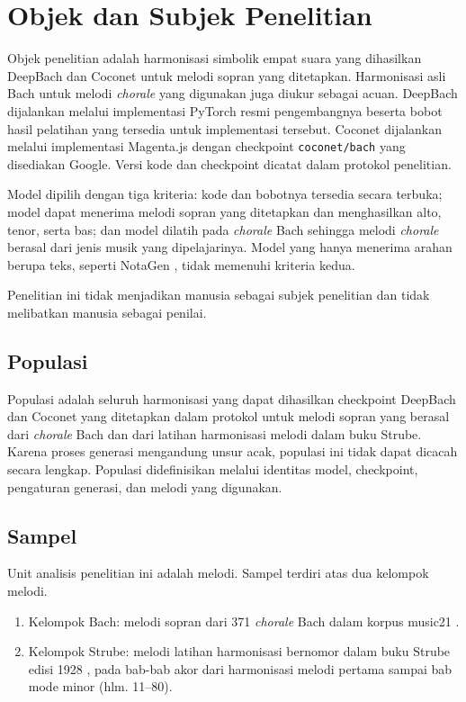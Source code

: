 \section{Objek dan Subjek Penelitian}

Objek penelitian adalah harmonisasi simbolik empat suara yang dihasilkan DeepBach \parencite{hadjeres2017} dan Coconet \parencite{huang2017} untuk melodi sopran yang ditetapkan. Harmonisasi asli Bach untuk melodi \textit{chorale} yang digunakan juga diukur sebagai acuan. DeepBach dijalankan melalui implementasi PyTorch resmi pengembangnya beserta bobot hasil pelatihan yang tersedia untuk implementasi tersebut. Coconet dijalankan melalui implementasi Magenta.js dengan checkpoint \texttt{coconet/bach} yang disediakan Google. Versi kode dan checkpoint dicatat dalam protokol penelitian.

Model dipilih dengan tiga kriteria: kode dan bobotnya tersedia secara terbuka; model dapat menerima melodi sopran yang ditetapkan dan menghasilkan alto, tenor, serta bas; dan model dilatih pada \textit{chorale} Bach sehingga melodi \textit{chorale} berasal dari jenis musik yang dipelajarinya. Model yang hanya menerima arahan berupa teks, seperti NotaGen \parencite{wang2025}, tidak memenuhi kriteria kedua.

Penelitian ini tidak menjadikan manusia sebagai subjek penelitian dan tidak melibatkan manusia sebagai penilai.

\subsection{Populasi}

Populasi adalah seluruh harmonisasi yang dapat dihasilkan checkpoint DeepBach dan Coconet yang ditetapkan dalam protokol untuk melodi sopran yang berasal dari \textit{chorale} Bach dan dari latihan harmonisasi melodi dalam buku Strube. Karena proses generasi mengandung unsur acak, populasi ini tidak dapat dicacah secara lengkap. Populasi didefinisikan melalui identitas model, checkpoint, pengaturan generasi, dan melodi yang digunakan.

\subsection{Sampel}

Unit analisis penelitian ini adalah melodi. Sampel terdiri atas dua kelompok melodi.

\begin{enumerate}
    \item Kelompok Bach: melodi sopran dari 371 \textit{chorale} Bach dalam korpus music21 \parencite{cuthbert2010}.
    \item Kelompok Strube: melodi latihan harmonisasi bernomor dalam buku Strube edisi 1928 \parencite{strube1928}, pada bab-bab akor dari harmonisasi melodi pertama sampai bab mode minor (hlm. 11--80).
\end{enumerate}

